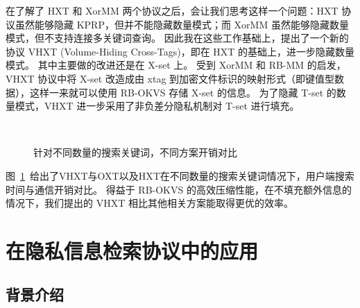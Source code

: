 在了解了 HXT 和 XorMM 两个协议之后，会让我们思考这样一个问题：HXT 协议虽然能够隐藏 KPRP，但并不能隐藏数量模式；而 XorMM 虽然能够隐藏数量模式，但不支持连接多关键词查询。
因此我在这些工作基础上，提出了一个新的协议 VHXT (Volume-Hiding Cross-Tags)，即在 HXT 的基础上，进一步隐藏数量模式。
其中主要做的改进还是在 X-set 上。
受到 XorMM 和 RB-MM 的启发，VHXT 协议中将 X-set 改造成由 xtag 到加密文件标识的映射形式（即键值型数据），这样一来就可以使用 RB-OKVS 存储 X-set 的信息。
为了隐藏 T-set 的数量模式，VHXT 进一步采用了非负差分隐私机制对 T-set 进行填充。
\begin{figure}[ht]
  \centering
  ~~
  \caption{针对不同数量的搜索关键词，不同方案开销对比}
  \label{fig:vhxt_client}
\end{figure}
图~\ref{fig:vhxt_client}~给出了VHXT与OXT以及HXT在不同数量的搜索关键词情况下，用户端搜索时间与通信开销对比。
得益于 RB-OKVS 的高效压缩性能，在不填充额外信息的情况下，我们提出的 VHXT 相比其他相关方案能取得更优的效率。

\section{在隐私信息检索协议中的应用}

\subsection{背景介绍}

